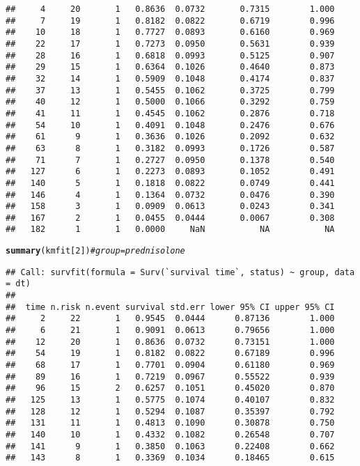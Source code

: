 \documentclass[12pt,fleqn]{article}\usepackage[]{graphicx}\usepackage[]{color}
\makeatletter
\newcommand{\hlnum}[1]{\textcolor[rgb]{0.686,0.059,0.569}{#1}}%
\newcommand{\hlcom}[1]{\textcolor[rgb]{0.678,0.584,0.686}{\textit{#1}}}%
\newcommand{\hlstd}[1]{\textcolor[rgb]{0.345,0.345,0.345}{#1}}%
\newcommand{\hlkwd}[1]{\textcolor[rgb]{0.737,0.353,0.396}{\textbf{#1}}}%
\newenvironment{kframe}{%
 \def\at@end@of@kframe{}%
 \ifinner\ifhmode%
  \def\at@end@of@kframe{\end{minipage}}%
  \begin{minipage}{\columnwidth}%
 \fi\fi%
 \def\FrameCommand##1{\hskip\@totalleftmargin \hskip-\fboxsep
 \colorbox{shadecolor}{##1}\hskip-\fboxsep
     \hskip-\linewidth \hskip-\@totalleftmargin \hskip\columnwidth}%
 \MakeFramed {\advance\hsize-\width
   \@totalleftmargin\z@ \linewidth\hsize
   \@setminipage}}%
 {\par\unskip\endMakeFramed%
 \at@end@of@kframe}
\newenvironment{knitrout}{}{} %
\theoremstyle{definition}
\makeatother
\begin{document}
\begin{enumerate}[1.]
\begin{enumerate}[(a)]
\begin{enumerate}[(1)]
\begin{knitrout}
\begin{kframe}
\begin{verbatim}
##     4     20       1   0.8636  0.0732       0.7315        1.000
##     7     19       1   0.8182  0.0822       0.6719        0.996
##    10     18       1   0.7727  0.0893       0.6160        0.969
##    22     17       1   0.7273  0.0950       0.5631        0.939
##    28     16       1   0.6818  0.0993       0.5125        0.907
##    29     15       1   0.6364  0.1026       0.4640        0.873
##    32     14       1   0.5909  0.1048       0.4174        0.837
##    37     13       1   0.5455  0.1062       0.3725        0.799
##    40     12       1   0.5000  0.1066       0.3292        0.759
##    41     11       1   0.4545  0.1062       0.2876        0.718
##    54     10       1   0.4091  0.1048       0.2476        0.676
##    61      9       1   0.3636  0.1026       0.2092        0.632
##    63      8       1   0.3182  0.0993       0.1726        0.587
##    71      7       1   0.2727  0.0950       0.1378        0.540
##   127      6       1   0.2273  0.0893       0.1052        0.491
##   140      5       1   0.1818  0.0822       0.0749        0.441
##   146      4       1   0.1364  0.0732       0.0476        0.390
##   158      3       1   0.0909  0.0613       0.0243        0.341
##   167      2       1   0.0455  0.0444       0.0067        0.308
##   182      1       1   0.0000     NaN           NA           NA
\end{verbatim}
\begin{alltt}
\hlkwd{summary}\hlstd{(kmfit[}\hlnum{2}\hlstd{])} \hlcom{# group=prednisolone}
\end{alltt}
\begin{verbatim}
## Call: survfit(formula = Surv(`survival time`, status) ~ group, data = dt)
## 
##  time n.risk n.event survival std.err lower 95% CI upper 95% CI
##     2     22       1   0.9545  0.0444      0.87136        1.000
##     6     21       1   0.9091  0.0613      0.79656        1.000
##    12     20       1   0.8636  0.0732      0.73151        1.000
##    54     19       1   0.8182  0.0822      0.67189        0.996
##    68     17       1   0.7701  0.0904      0.61180        0.969
##    89     16       1   0.7219  0.0967      0.55522        0.939
##    96     15       2   0.6257  0.1051      0.45020        0.870
##   125     13       1   0.5775  0.1074      0.40107        0.832
##   128     12       1   0.5294  0.1087      0.35397        0.792
##   131     11       1   0.4813  0.1090      0.30878        0.750
##   140     10       1   0.4332  0.1082      0.26548        0.707
##   141      9       1   0.3850  0.1063      0.22408        0.662
##   143      8       1   0.3369  0.1034      0.18465        0.615

\end{verbatim}
\end{kframe}
\end{knitrout}
\end{enumerate}
\end{enumerate}
\end{enumerate}
\end{document}
